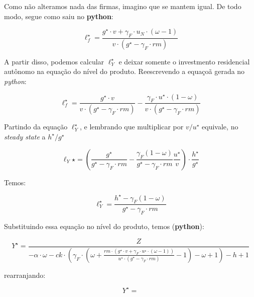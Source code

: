 \documentclass[11pt]{article}
\begin{document}
Como não alteramos nada das firmas, imagino que se mantem igual.
De todo modo, segue como saiu no \textbf{python}:

\begin{latex}
\begin{equation}
\ell^{\star}_{f} = \frac{g^\star \cdot v + \gamma_{F} \cdot u_{N} \cdot \left(\omega - 1\right)}{v \cdot \left(g^\star - \gamma_{F} \cdot rm\right)}
\end{equation}
\end{latex}

A partir disso, podemos calcular \(\ell^{\star}_{Y}\) e deixar somente o investmento residencial autônomo na equação do nível do produto.
Reescrevendo a equaçoã gerada no \emph{python}:
\begin{latex}
\begin{equation}
\ell^{\star}_{f} = \frac{g^\star \cdot v}{v \cdot \left(g^\star - \gamma_{F} \cdot rm\right)} - \frac{\gamma_{F} \cdot u^{\star} \cdot \left(1- \omega\right)}{v \cdot \left(g^\star - \gamma_{F} \cdot rm\right)}
\end{equation}
\end{latex}
Partindo da equação \(\ell^{\star}_{Y}\), e lembrando que multiplicar por \(v/u^{\star}\) equivale, no \emph{steady state} a \(h^{\star}/g^{\star}\)
\begin{latex}
\begin{equation}
\ell_{Y}\star = \left(\frac{g^{\star}}{g^{\star} - \gamma_{F}\cdot rm} - \frac{\gamma_{F}(1-\omega)}{g^{\star} - \gamma_{F}\cdot rm}\frac{u^{\star}}{v}\right)\cdot\frac{h^{\star}}{g^{\star}}
\end{equation}
\end{latex}
Temos:
\begin{latex}
\begin{equation}
\ell^{\star}_{Y} = \frac{h^{\star} - \gamma_{F}(1-\omega)}{g^{\star} - \gamma_{F}\cdot rm}
\end{equation}
\end{latex}

Substituindo essa equação no nível do produto, temos (\textbf{python}):
\begin{latex}
\begin{equation}
Y^{\star} = \frac{Z}{- \alpha \cdot \omega - ck \cdot \left(\gamma_{F} \cdot \left(\omega + \frac{rm \cdot \left(g^\star \cdot v + \gamma_{F} \cdot u^\star \cdot \left(\omega - 1\right)\right)}{u^\star \cdot \left(g^\star - \gamma_{F} \cdot rm\right)} - 1\right) - \omega + 1\right) - h + 1}
\end{equation}
\end{latex}
rearranjando:
\begin{latex}
\begin{equation}
Y^{\star} =
\end{equation}
\end{latex}
\end{document}
